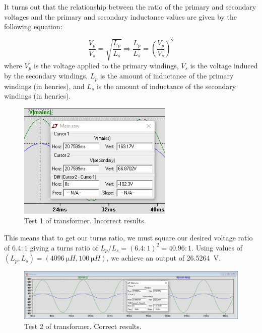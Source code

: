 \documentclass{article}
\begin{document}
\newpage

It turns out that the relationship between the ratio of the
primary and secondary voltages and the primary and secondary
inductance values are given by the following equation:

\begin{equation}
    \frac{V_p}{V_s} = \sqrt{\frac{L_p}{L_s}} \Rightarrow
    \frac{L_p}{L_s} = \left(\frac{V_p}{V_s}\right)^2
\end{equation} where \(V_p\) is the voltage applied to the
primary windings, \(V_s\) is the voltage induced by the
secondary windings, \(L_p\) is the amount of inductance of
the primary windings (in henries), and \(L_s\) is the amount
of inductance of the secondary windings (in henries).

\begin{figure}[h]
    \centering
    \includegraphics[height=15em]{Images/TransformerSimulation1.jpg}
    \caption{Test 1 of transformer. Incorrect results.}
    \label{fig3}
\end{figure}

This means that to get our turns ratio, we must square our
desired voltage ratio of \(6.4:1\) giving a turns ratio
of \(L_p / L_s = (6.4:1)^2 = 40.96:1\). Using values of
\((L_p, L_s) = (\SI{4096}{\micro H}, \SI{100}{\micro H})\),
we achieve an output of \SI{26.5264}{V}.

\begin{figure}[h]
    \centering
    \includegraphics[width=\textwidth]{Images/TransformerSimulation2.jpg}
    \caption{Test 2 of transformer. Correct results.}
    \label{fig4}
\end{figure}
\end{document}

